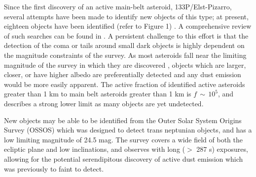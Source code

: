 \documentclass[iop,apj]{emulateapj}
\begin{document}



Since the first discovery of an active main-belt asteroid, 133P/Elst-Pizarro, several attempts have been made to identify new objects of this type; at present, eighteen objects have been identified (refer to Figure 1) \citep{jewitt15}. A comprehensive review of such searches can be found in \citet{hsieh15}.  A persistent challenge to this effort is that the detection of the coma or tails around small dark objects is highly dependent on the magnitude constraints of the survey. As most asteroids fall near the limiting magnitude of the survey in which they are discovered \cite{jewitt15}%
, objects which are larger, closer, or have higher albedo are preferentially detected and any dust emission would be more easily apparent. The active fraction of identified active asteroids greater than 1 km to main belt asteroids greater than 1 km is $f \, \sim \, 10^5$, and describes a strong lower limit as many objects are yet undetected. \citep{jewitt15} %


New objects may be able to be identified from the Outer Solar System Origins Survey (OSSOS) which was designed to detect trans neptunian objects, and has a low limiting magnitude of 24.5 mag. The survey covers a wide field of both the ecliptic plane and low inclinations, and observes with long ($>$ 287 s) exposures, allowing for the potential serendipitous discovery of active dust emission which was previously to faint to detect.
\end{document}

